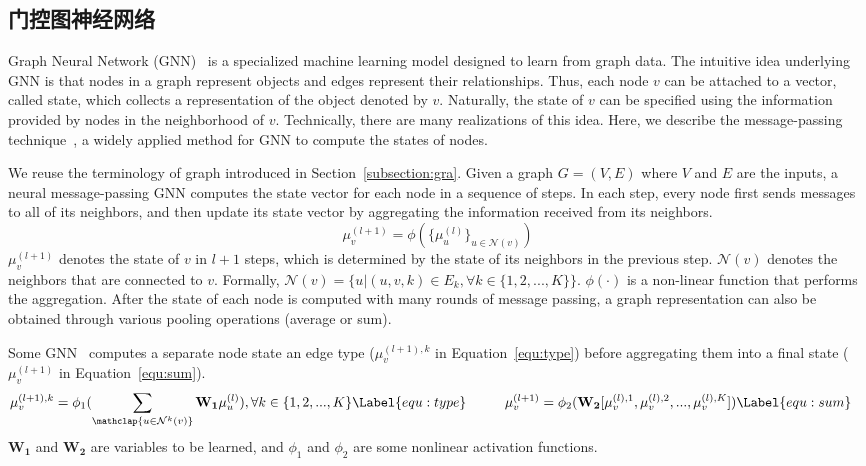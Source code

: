 \subsection{门控图神经网络}\label{sec:related:ggnn}

Graph Neural Network (GNN)~\cite{gori2005new} is a specialized machine learning model designed to learn from graph data. The intuitive idea underlying GNN is that nodes in a graph represent objects and edges represent their relationships. Thus, each node $v$ can be attached to a vector, called state, which collects a representation of the object denoted by $v$. Naturally, the state of $v$ can be specified using the information provided by nodes in the neighborhood of $v$. Technically, there are many realizations of this idea. Here, we describe the message-passing technique~\cite{Gilmer10}, a widely applied method for GNN to compute the states of nodes.

We reuse the terminology of graph introduced in Section~\ref{subsection:gra}. Given a graph ${G}\! =\! ({V}, {E})$ where ${V}$ and ${E}$ are the inputs, a neural message-passing GNN computes the state vector for each node in a sequence of steps. In each step, every node first sends messages to all of its neighbors, and then update its state vector by aggregating the information received from its neighbors.
\begin{equation}
\mu^{(l+1)}_{v} = \phi(\{\mu^{(l)}_{u}\}_{u \in \mathcal{N}(v)})  \label{equ:h} %
\end{equation}
$\mu^{(l+1)}_{v}$ denotes the state of $v$ in $l+1$ steps, which is determined by the state of its neighbors in the previous step. $\mathcal{N}{(v)}$ denotes the neighbors that are connected to $v$. Formally, $\mathcal{N}{(v)} = \{u|(u,v,k) \in {E}_k, \forall k \in \{1,2,...,K\}\}$. $\phi(\cdot)$ is a non-linear function that performs the aggregation. After the state of each node is computed with many rounds of message passing, a graph representation can also be obtained through various pooling operations (\eg average or sum). 

Some GNN~\cite{Si10} computes a separate node state \wrt an edge type (\ie $\mu^{(l+1), k}_{v}$ in Equation~\ref{equ:type}) before aggregating them into a final state (\ie $\mu^{(l+1)}_{v}$ in Equation~\ref{equ:sum}).
\begin{align*}
\mu^{(l+1), k}_{v} &= \phi_1(\sum_{\mathclap{u \in \mathcal{N}^{k}{(v)}}} \mathbf{W_1} \mu_u^{(l)}), \forall k \in \{1,2,...,K\} \Label{equ:type} &\;\;\;\;\;\;\,
\mu^{(l+1)}_{v} &= \phi_2(\mathbf{W_2}[ \mu_v^{(l), 1}, \mu_v^{(l), 2}, ..., \mu_v^{(l), K}]) \Label{equ:sum}
\end{align*}
$\mathbf{W_1}$ and $\mathbf{W_2}$ are variables to be learned, and $\phi_1$ and $\phi_2$ are some nonlinear activation functions.

